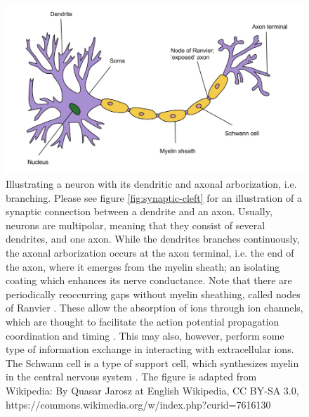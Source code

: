 \begin{figure}
    \centering
    \includegraphics[width=12cm]{fig/neuron-figure-wikipedia}
    \caption{Illustrating a neuron with its dendritic and axonal arborization, i.e. branching. Please see figure \ref{fig:synaptic-cleft} for an illustration of a synaptic connection between a dendrite and an axon. Usually, neurons are multipolar, meaning that they consist of several dendrites, and one axon. While the dendrites branches continuously, the axonal arborization occurs at the axon terminal, i.e. the end of the axon, where it emerges from the myelin sheath; an isolating coating which enhances its nerve conductance. Note that there are periodically reoccurring gaps without myelin sheathing, called nodes of Ranvier \citep{Byrne2014chpt1p11}. These allow the absorption of ions through ion channels, which are thought to facilitate the action potential propagation coordination and timing \citep{Byrne2014chpt2p26}. This may also, however, perform some type of information exchange in interacting with extracellular ions. The Schwann cell is a type of support cell, which synthesizes myelin in the central nervous system \citep{Byrne2014chpt1p11}.
    The figure is adapted from Wikipedia: By Quasar Jarosz at English Wikipedia, CC BY-SA 3.0, https://commons.wikimedia.org/w/index.php?curid=7616130}
    \label{fig:neurons-synapses}
\end{figure}

